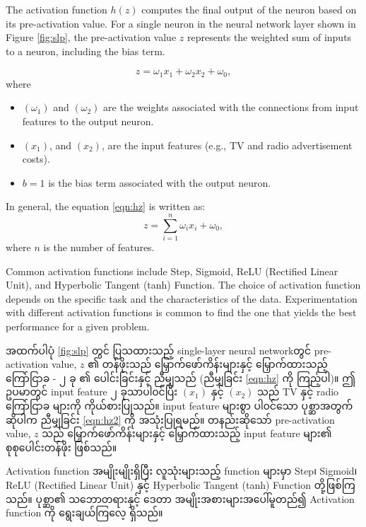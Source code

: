 The activation function $h(z)$ computes the final output of the neuron based on its pre-activation value. For a single neuron  in the neural network layer shown in Figure \ref{fig:slp}, the pre-activation value $z$ represents the weighted sum of inputs to a neuron, including the bias term.

\begin{equation}\label{eqn:hz}
  z = \omega_1 x_1 + \omega_2 x_2 + \omega_0, 
\end{equation} where 

\begin{itemize}[b]
  \item $(\omega_1)$ and $(\omega_2)$ are the weights associated with the connections from input features to the output neuron. 
  \item $( x_1 ) $, and $( x_2)$, are the input features (e.g., TV and radio advertisement costs).
  \item $b=1$ is the bias term associated with the output neuron.
\end{itemize}

\noindent In general, the equation \ref{eqn:hz} is written as: 
\begin{equation}\label{eqn:hz2}
  z = \sum_{i=1}^{n} \omega_i x_i + \omega_0, 
\end{equation} where $n$ is the number of features. 

\vspace{0.5em}
Common activation functions include Step, Sigmoid, ReLU (Rectified Linear Unit),  and Hyperbolic Tangent (tanh) Function. The choice of activation function depends on the specific task and the characteristics of the data. Experimentation with different activation functions is common to find the one that yields the best performance for a given problem.

\vspace{0.5em}
\noindent အထက်ပါပုံ  \ref{fig:slp} တွင် ပြသထားသည့် single-layer neural networkတွင် pre-activation value, $z$ ၏ တန်ဖိုးသည် မြှောက်ဖော်ကိန်းများနှင့် မြှောက်ထားသည့် ကြော်ငြာခ - ၂ ခု ၏ ပေါင်းခြင်းနှင့် ညီမျှသည် (ညီမျှခြင်း \ref{eqn:hz} ကို ကြည့်ပါ)။  ဤဥပမာတွင် input feature ၂ ခုသာပါ၀င်ပြီး $( x_1 ) $ နှင့် $( x_2)$ သည် TV နှင့် radio ကြော်ငြာခ များကို ကိုယ်စားပြုသည်။ input feature များစွာ ပါ၀င်သော ပုစ္ဆာအတွက် ဆိုပါက ညီမျှခြင်း \ref{eqn:hz2} ကို အသုံးပြုရမည်။ တနည်းဆိုသော် pre-activation value, $z$ သည် မြှောက်ဖော်ကိန်းများနှင့် မြှောက်ထားသည့် input feature များ၏ စုစုပေါင်းတန်ဖိုး ဖြစ်သည်။

\noindent Activation function အမျိုးမျိုးရှိပြီး လူသုံးများသည့် function များမှာ Step၊ Sigmoid၊  ReLU (Rectified Linear Unit) နှင့် Hyperbolic Tangent (tanh) Function တို့ဖြစ်ကြသည်။ ပုစ္ဆာ၏ သဘောတရားနှင့် ဒေတာ အမျိုးအစားများအပေါ်မူတည်၍ Activation function ကို ရွေးချယ်ကြလေ့ ရှိသည်။ 

